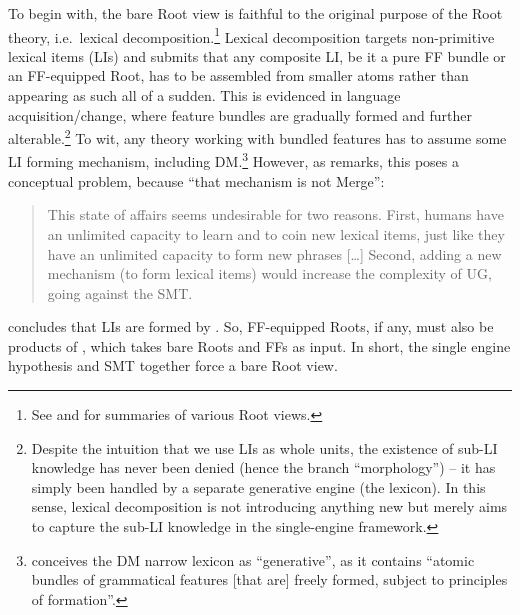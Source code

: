 \documentclass[output=paper]{langsci/langscibook}
\begin{document}
To begin with, the bare Root view is faithful to the original purpose of the
Root theory, i.e.\ lexical decomposition.\footnote{See \citet[11]{Ramchand2008}
and \citet[192]{Gallego2014b} for summaries of various Root views.} Lexical
decomposition targets non-primitive lexical items (LIs) and submits that any
composite LI, be it a pure FF bundle or an FF-equipped Root, has to be
assembled from smaller atoms rather than appearing as such all of a sudden.
This is evidenced in language acquisition/change, where feature bundles are
gradually formed and further alterable.\footnote{Despite the intuition that we
    use LIs as whole units, the existence of sub-LI knowledge has never been
    denied (hence the branch ``morphology'') -- it has simply been handled by a
    separate generative engine (the lexicon). In this sense, lexical
decomposition is not introducing anything new but merely aims to capture the
sub-LI knowledge in the single-engine framework.} To wit, any theory working
with bundled features has to assume some LI forming mechanism, including
\gls{DM}.\footnote{\citet[203]{Marantz1997} conceives the \gls{DM} narrow lexicon as
``generative'', as it contains ``atomic bundles of grammatical features [that
are] freely formed, subject to principles of formation''.} However, as
\citet{Collins2017} remarks, this poses a conceptual problem, because ``that
mechanism is not Merge'':

\blockquote[{\citealt[61]{Collins2017}}]{This state of affairs seems
    undesirable for two reasons. First, humans have an unlimited capacity to
    learn and to coin new lexical items, just like they have an unlimited
    capacity to form new phrases [\dots] Second, adding a new mechanism (to
form lexical items) would increase the complexity of \gls{UG}, going against
the \gls{SMT}.}

\noindent \citeauthor{Collins2017} concludes that LIs are formed by
. So, FF-equipped Roots, if any, must also be products of
, which takes bare Roots and FFs as input.  In short, the single
engine hypothesis and \gls{SMT} together force a
bare Root view.
\end{document}
